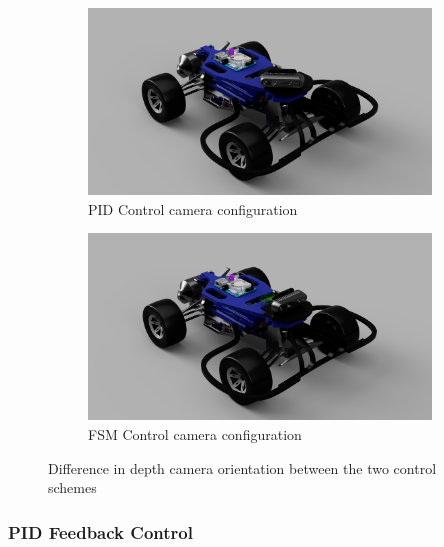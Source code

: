 \documentclass[letterpaper, 10 pt, conference]{ieeeconf}  %
\begin{document}
\begin{figure}[h!]
    \centering
    \begin{subfigure}[b]{.45\textwidth}
        \includegraphics[width=\textwidth]{Figures/cam_offset.png}
        \caption{PID Control camera configuration}
        \label{fig:single-state}
    \end{subfigure}
    \begin{subfigure}[b]{.45\textwidth}
        \includegraphics[width=\textwidth]{Figures/cam_centered.png}
        \caption{FSM Control camera configuration}
        \label{fig:multi-state}
    \end{subfigure}
    \caption{Difference in depth camera orientation between the two control schemes}
    \label{fig:camera_config}
\end{figure}


\subsubsection{PID Feedback Control}
\end{document}

